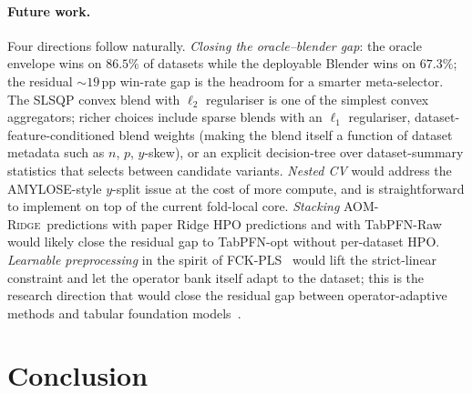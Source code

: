 \documentclass[11pt,a4paper]{article}
\newcommand{\AOMR}{\textsc{AOM-Ridge}\xspace}
\begin{document}
\paragraph{Future work.}
Four directions follow naturally. \emph{Closing the oracle--blender
gap}: the oracle envelope wins on $86.5\%$ of datasets while the
deployable Blender wins on $67.3\%$; the residual $\sim 19$\,pp
win-rate gap is the headroom for a smarter meta-selector. The
SLSQP convex blend with $\ell_2$ regulariser is one of the simplest
convex aggregators; richer choices include sparse blends with an
$\ell_1$ regulariser, dataset-feature-conditioned blend weights
(making the blend itself a function of dataset metadata such as
$n$, $p$, $y$-skew), or an explicit decision-tree over
dataset-summary statistics that selects between candidate variants.
\emph{Nested CV} would address the AMYLOSE-style $y$-split issue at
the cost of more compute, and is straightforward to implement on top
of the current fold-local core. \emph{Stacking} \AOMR\ predictions
with paper Ridge HPO predictions and with TabPFN-Raw would likely
close the residual gap to TabPFN-opt without per-dataset HPO.
\emph{Learnable preprocessing} in the spirit of
FCK-PLS~\citep[the FCK-PLS prior work cited
in][]{beurier2026aompls} would lift the strict-linear constraint and
let the operator bank itself adapt to the dataset; this is the
research direction that would close the residual gap between
operator-adaptive methods and tabular foundation
models~\citep{hollmann2025tabpfn}.

\section{Conclusion}\label{sec:conclusion}
\end{document}
